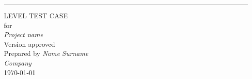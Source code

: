 \begin{flushright}
    \rule{16cm}{5pt}\vskip1cm
    \begin{bfseries}
        \Huge{LEVEL TEST CASE}\\
        \vspace{1.9cm}
        for\\
        \vspace{1.9cm}
	    \textit{Project name}\\
        \vspace{1.9cm}
        \LARGE{Version \myversion approved}\\
        \vspace{1.9cm}
        Prepared by \textit{Name Surname}\\
        \vspace{1.9cm}
        \textit{Company}\\
        \vspace{1.9cm}
        \today\\
    \end{bfseries}
\end{flushright}